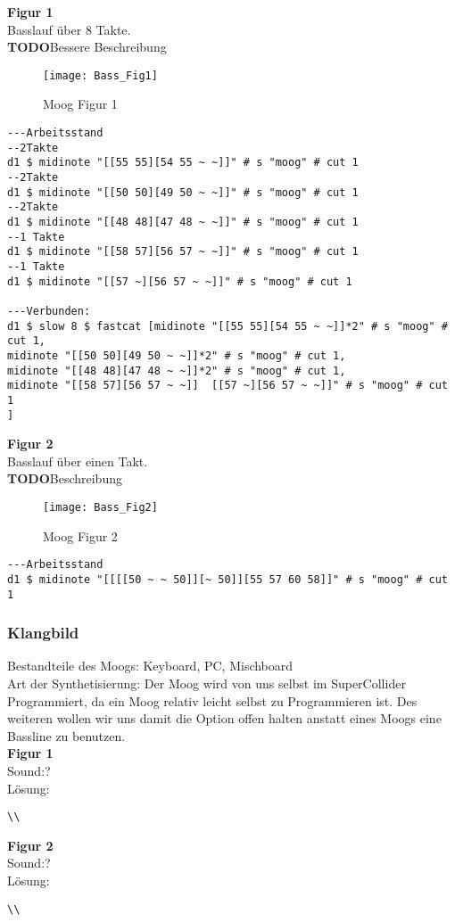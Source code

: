 \documentclass[
10pt, %
a4paper, %
oneside, %
headinclude,footinclude, %
BCOR5mm, %
]{scrartcl}
\begin{document}
\noindent\textbf{Figur 1}\\
Basslauf über 8 Takte.\\
{\color{red}\textbf{TODO}}Bessere Beschreibung\\
\begin{figure}[h]
	\centering 
	\texttt{[image: Bass\_Fig1]} 
	\caption{Moog Figur 1}
\end{figure}

\begin{lstlisting}
---Arbeitsstand
--2Takte
d1 $ midinote "[[55 55][54 55 ~ ~]]" # s "moog" # cut 1
--2Takte
d1 $ midinote "[[50 50][49 50 ~ ~]]" # s "moog" # cut 1
--2Takte
d1 $ midinote "[[48 48][47 48 ~ ~]]" # s "moog" # cut 1
--1 Takte
d1 $ midinote "[[58 57][56 57 ~ ~]]" # s "moog" # cut 1
--1 Takte
d1 $ midinote "[[57 ~][56 57 ~ ~]]" # s "moog" # cut 1

---Verbunden:
d1 $ slow 8 $ fastcat [midinote "[[55 55][54 55 ~ ~]]*2" # s "moog" # cut 1,
midinote "[[50 50][49 50 ~ ~]]*2" # s "moog" # cut 1,
midinote "[[48 48][47 48 ~ ~]]*2" # s "moog" # cut 1,
midinote "[[58 57][56 57 ~ ~]]  [[57 ~][56 57 ~ ~]]" # s "moog" # cut 1
]
\end{lstlisting}

\noindent\textbf{Figur 2}\\
Basslauf über einen Takt.\\
{\color{red}\textbf{TODO}}Beschreibung\\
\begin{figure}[h]
	\centering 
	\texttt{[image: Bass\_Fig2]} 
	\caption{Moog Figur 2}
\end{figure}

\begin{lstlisting}
---Arbeitsstand
d1 $ midinote "[[[[50 ~ ~ 50]][~ 50]][55 57 60 58]]" # s "moog" # cut 1
\end{lstlisting}



\subsubsection{Klangbild}
Bestandteile des Moogs: Keyboard, PC, Mischboard\\
Art der Synthetisierung: Der Moog wird von uns selbst im SuperCollider Programmiert, da ein Moog relativ leicht selbst zu Programmieren ist.
Des weiteren wollen wir uns damit die Option offen halten anstatt eines Moogs eine Bassline zu benutzen.\\
\noindent\textbf{Figur 1}\\
Sound:?\\
Lösung:\\
\begin{lstlisting}
\\
\end{lstlisting}
\noindent\textbf{Figur 2}\\
Sound:?\\
Lösung:\\
\begin{lstlisting}
\\
\end{lstlisting}
\end{document}
